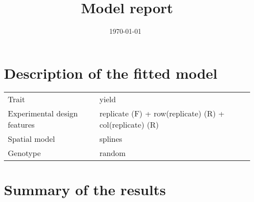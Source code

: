 \documentclass[a4paper,11pt]{article}\usepackage[]{graphicx}\usepackage[]{color}
\title{Model report}%
\author{\vspace{-5ex}}
\date{\today\ \currenttime} %
\makeatletter
\def\@abstractline{\textwidth}
\renewenvironment{abstract}
{
\ifhmode\begingroup\parskip0pt\par\noindent\endgroup\fi%
\begin{rmfamily}
{\noindent\bfseries\large\abstractname\vspace{-0.5em}}
{\par\vbox{\hrule width \@abstractline}}
}{
\ifhmode\begingroup\parskip0pt\par\noindent\endgroup\fi %
\par\vbox{\hrule width \@abstractline}%
\end{rmfamily}
}
\makeatother
\begin{document}



\maketitle

\singlespacing



\section{Description of the fitted model}

\begin{table}[ht]
\begin{flushleft}
\begin{tabular}{ll}
  Trait & yield \\ 
  Experimental design features & replicate (F) + row(replicate) (R) + col(replicate) (R) \\ 
  Spatial model & splines \\ 
  Genotype & random \\ 
  \end{tabular}
\label{modelDescription}
\end{flushleft}
\end{table}


\section{Summary of the results}
\end{document}
